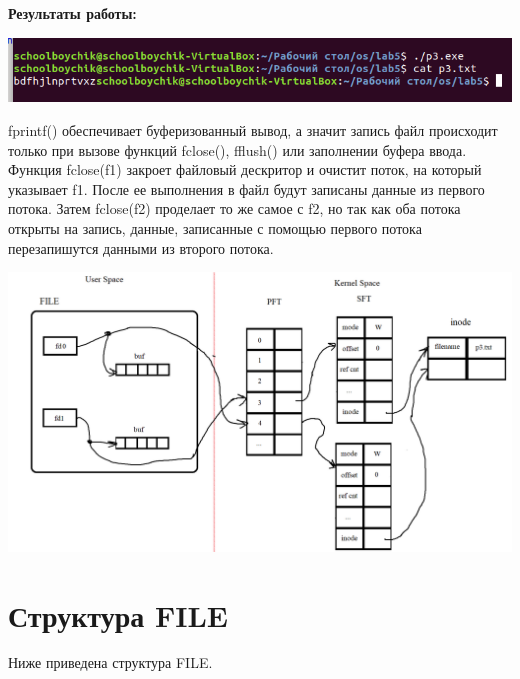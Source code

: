 \textbf{Результаты работы:}

\includegraphics[scale=1]{img/Screenshot_3.png}

fprintf() обеспечивает буферизованный вывод, а значит запись файл происходит только при вызове функций fclose(), fflush() или заполнении буфера ввода. Функция fclose(f1) закроет файловый дескритор и очистит поток, на который указывает f1. После ее выполнения в файл будут записаны данные из первого потока. Затем fclose(f2) проделает то же самое с f2, но так как оба потока открыты на запись, данные, записанные с помощью первого потока перезапишутся данными из второго потока.

\includegraphics[scale=0.45]{img/3.png}
\newpage
\section*{Структура FILE}

Ниже приведена структура FILE.

